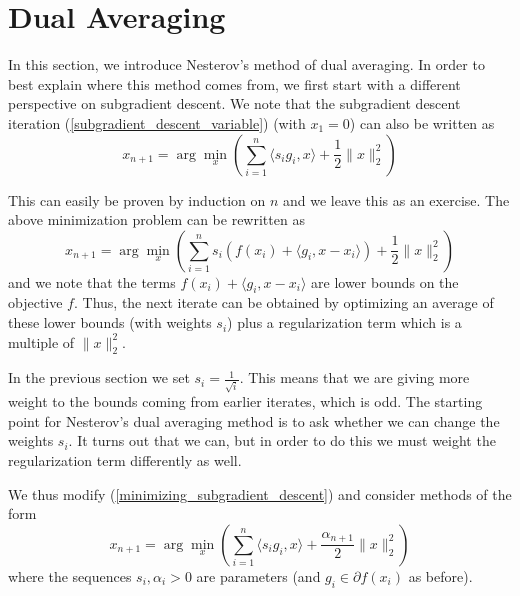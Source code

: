 \section{Dual Averaging}
In this section, we introduce Nesterov's method of dual averaging. In order to best explain where this method comes from,
we first start with a different perspective on subgradient descent. We note that the subgradient descent iteration
(\ref{subgradient_descent_variable}) (with $x_1 = 0$) can also be written as
\begin{equation}\label{minimizing_subgradient_descent}
 x_{n+1} = \arg\min_x \left(\displaystyle\sum_{i = 1}^n \langle s_ig_i, x\rangle + \frac{1}{2}\|x\|_2^2\right)
\end{equation}

This can easily be proven by induction on $n$ and we leave this as an exercise. The above minimization problem
can be rewritten as
\begin{equation}
 x_{n+1} = \arg\min_x \left(\displaystyle\sum_{i = 1}^ns_i(f(x_i) + \langle g_i, x - x_i\rangle) + \frac{1}{2}\|x\|_2^2\right)
\end{equation}
and we note that the terms $f(x_i) + \langle g_i, x - x_i\rangle$ are lower bounds on the objective $f$. Thus, the next iterate
can be obtained by optimizing an average of these lower bounds (with weights $s_i$) plus a regularization term which is a multiple
of $\|x\|_2^2$.

In the previous section we set $s_i = \frac{1}{\sqrt{i}}$. This means that we are giving more weight to the bounds coming from
earlier iterates, which is odd. The starting point for Nesterov's dual averaging method is to ask whether we can change the
weights $s_i$. It turns out that we can, but in order to do this we must weight the regularization term differently as well.

We thus modify (\ref{minimizing_subgradient_descent}) and consider methods of the form
\begin{equation}\label{generalized_dual_averaging}
 x_{n+1} = \arg\min_x \left(\displaystyle\sum_{i = 1}^n \langle s_ig_i, x\rangle + \frac{\alpha_{n+1}}{2}\|x\|_2^2\right)
\end{equation}
where the sequences $s_i,\alpha_i > 0$ are parameters (and $g_i\in \partial f(x_i)$ as before).

